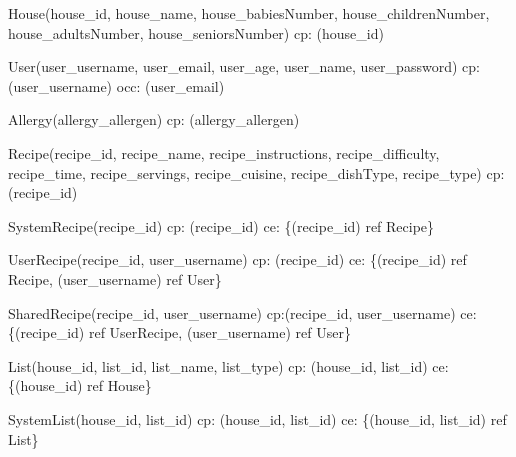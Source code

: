{\parindent 0pt
	\begin{description}
		\item House(house\_id, house\_name, house\_babiesNumber, house\_childrenNumber, house\_adultsNumber, house\_seniorsNumber) \newline
		\acrshort{cp}: (house\_id) 
		
		\item User(user\_username, user\_email, user\_age, user\_name, user\_password) \newline
		\acrshort{cp}: (user\_username)  \newline
		\acrshort{occ}: (user\_email)
		
		\item Allergy(allergy\_allergen) \newline
		\acrshort{cp}: (allergy\_allergen) 
		
		\item Recipe(recipe\_id, recipe\_name, recipe\_instructions, recipe\_difficulty, recipe\_time, recipe\_servings, recipe\_cuisine, recipe\_dishType, recipe\_type) \newline
		\acrshort{cp}: (recipe\_id) 
		
		\item SystemRecipe(recipe\_id) \newline
		\acrshort{cp}: (recipe\_id) \newline
		\acrshort{ce}: \{(recipe\_id) ref Recipe\}
		
		\item UserRecipe(recipe\_id, user\_username) \newline
		\acrshort{cp}: (recipe\_id) \newline
		\acrshort{ce}: \{(recipe\_id) ref Recipe, (user\_username) ref User\}
		
		\item SharedRecipe(recipe\_id, user\_username) \newline
		\acrshort{cp}:(recipe\_id, user\_username) \newline
		\acrshort{ce}: \{(recipe\_id) ref UserRecipe, (user\_username) ref User\}
		
		\item List(house\_id, list\_id, list\_name, list\_type) \newline
		\acrshort{cp}: (house\_id, list\_id) \newline
		\acrshort{ce}: \{(house\_id) ref House\}
		
		\item SystemList(house\_id, list\_id)
		\newline
		\acrshort{cp}: (house\_id, list\_id) \newline
		\acrshort{ce}: \{(house\_id, list\_id) ref List\}
		

\end{description}}
